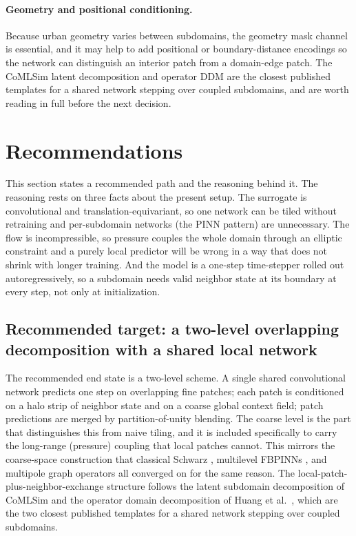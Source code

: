\documentclass[11pt]{article}
\begin{document}
\paragraph{Geometry and positional conditioning.} Because urban geometry varies
between subdomains, the geometry mask channel is essential, and it may help to add
positional or boundary-distance encodings so the network can distinguish an
interior patch from a domain-edge patch. The CoMLSim latent decomposition
\cite{hanna2024comlsim} and operator DDM \cite{huang2025operatorddm} are the
closest published templates for a shared network stepping over coupled
subdomains, and are worth reading in full before the next decision.

\section{Recommendations}

This section states a recommended path and the reasoning behind it. The reasoning
rests on three facts about the present setup. The surrogate is convolutional and
translation-equivariant, so one network can be tiled without retraining and
per-subdomain networks (the PINN pattern) are unnecessary. The flow is
incompressible, so pressure couples the whole domain through an elliptic
constraint and a purely local predictor will be wrong in a way that does not
shrink with longer training. And the model is a one-step time-stepper rolled out
autoregressively, so a subdomain needs valid neighbor state at its boundary at
every step, not only at initialization.

\subsection*{Recommended target: a two-level overlapping decomposition with a shared local network}

The recommended end state is a two-level scheme. A single shared convolutional
network predicts one step on overlapping fine patches; each patch is conditioned
on a halo strip of neighbor state and on a coarse global context field; patch
predictions are merged by partition-of-unity blending. The coarse level is the
part that distinguishes this from naive tiling, and it is included specifically
to carry the long-range (pressure) coupling that local patches cannot. This
mirrors the coarse-space construction that classical Schwarz
\cite{dryja1994smalloverlap}, multilevel FBPINNs \cite{dolean2024multilevel}, and
multipole graph operators \cite{li2020mgno} all converged on for the same reason.
The local-patch-plus-neighbor-exchange structure follows the latent subdomain
decomposition of CoMLSim \cite{hanna2024comlsim} and the operator domain
decomposition of Huang et al.\ \cite{huang2025operatorddm}, which are the two
closest published templates for a shared network stepping over coupled
subdomains.
\end{document}

